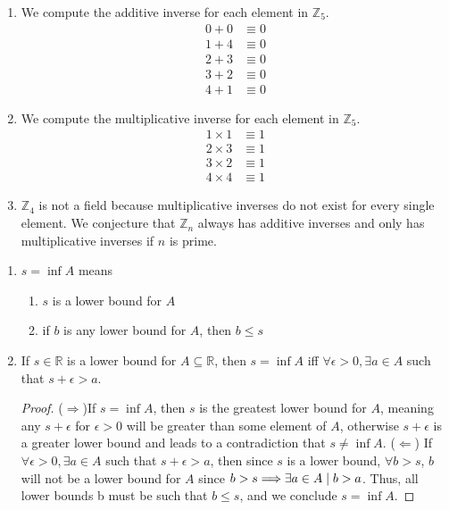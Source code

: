 \setcounter{subsection}{3}
\setcounter{exercise}{0}

\begin{exercise}
\begin{enumerate}[label=(\alph*)]
	\item We compute the additive inverse for each element in $\mathbb{Z}_5$. 
	\begin{align*}
		0 + 0 &\equiv 0 \\
		1 + 4 &\equiv 0 \\
		2 + 3 &\equiv 0 \\
		3 + 2 &\equiv 0 \\
		4 + 1 &\equiv 0
	\end{align*}
	\item We compute the multiplicative inverse for each element in $\mathbb{Z}_5$. 
	\begin{align*}
		1 \times 1 &\equiv 1 \\
		2 \times 3 &\equiv 1 \\
		3 \times 2 &\equiv 1 \\
		4 \times 4 &\equiv 1
	\end{align*}
	\item $\mathbb{Z}_4$ is not a field because multiplicative inverses do not exist for every single element. We conjecture that $\mathbb{Z}_n$ always has additive inverses and only has multiplicative inverses if $n$ is prime.
\end{enumerate}
\end{exercise}

\begin{exercise}
\begin{enumerate}[label=(\alph*)]
	\item  $s = \inf A$ means 
	\begin{enumerate}[label=\roman*)]
		\item $s$ is a lower bound for $A$
		\item if $b$ is any lower bound for $A$, then $b \leq s$
	\end{enumerate}
	\item If $s\in \mathbb{R}$ is a lower bound for $A \subseteq \mathbb{R}$, then $s=\inf A$ iff $\forall \epsilon > 0, \exists a \in A$ such that $s + \epsilon > a$.
	\begin{proof}
		($\Rightarrow$)If $s=\inf A$, then $s$ is the greatest lower bound for $A$, meaning any $s+ \epsilon$ for $\epsilon > 0$ will be greater than some element of $A$, otherwise $s+ \epsilon$ is a greater lower bound and leads to a contradiction that $s \neq \inf A$.
		($\Leftarrow$) If $\forall \epsilon > 0, \exists a \in A$ such that $s+\epsilon > a$, then since $s$ is a lower bound, $\forall b > s$, $b$ will not be a lower bound for $A$ since $b > s \Longrightarrow \exists a \in A \mid b > a$. Thus, all lower bounds b must be such that $b \leq s$, and we conclude $s = \inf A$.
	\end{proof}
\end{enumerate}
\end{exercise}

